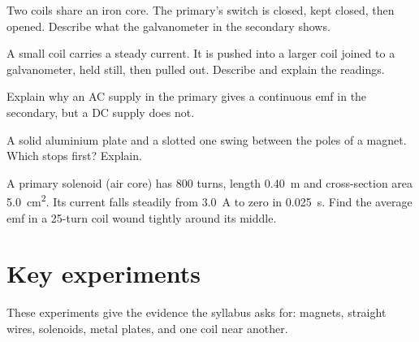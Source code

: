 \begin{quickcheck}
  \item Two coils share an iron core. The primary's switch is closed, kept closed,
        then opened. Describe what the galvanometer in the secondary shows.
  \item A small coil carries a steady current. It is pushed into a larger coil
        joined to a galvanometer, held still, then pulled out. Describe and
        explain the readings.
  \item Explain why an AC supply in the primary gives a continuous emf in the
        secondary, but a DC supply does not.
  \item A solid aluminium plate and a slotted one swing between the poles of a
        magnet. Which stops first? Explain.
  \item A primary solenoid (air core) has 800 turns, length \qty{0.40}{m} and
        cross-section area \qty{5.0}{cm^2}. Its current falls steadily from
        \qty{3.0}{A} to zero in \qty{0.025}{s}. Find the average emf in a 25-turn
        coil wound tightly around its middle.
\end{quickcheck}

\section{Key experiments}\label{ch3:sec:experiments}

These experiments give the evidence the syllabus asks for: magnets, straight
wires, solenoids, metal plates, and one coil near another.

